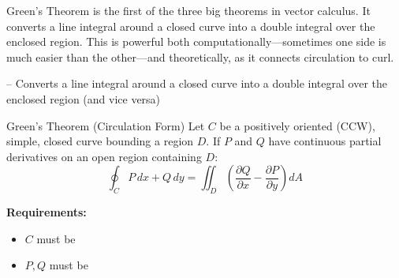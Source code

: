\documentclass[11pt]{article}
\begin{document}

\begin{background}
Green's Theorem is the first of the three big theorems in vector calculus. It converts a line integral around a closed curve into a double integral over the enclosed region. This is powerful both computationally---sometimes one side is much easier than the other---and theoretically, as it connects circulation to curl.
\end{background}


-- Converts a line integral around a closed curve into a double integral over the enclosed region (and vice versa)

\begin{thmbox}{Green's Theorem (Circulation Form)}
Let $C$ be a positively oriented (CCW), simple, closed curve bounding a region $D$. If $P$ and $Q$ have continuous partial derivatives on an open region containing $D$:
\[\boxed{\oint_C P\,dx + Q\,dy = \iint_D \left(\frac{\partial Q}{\partial x} - \frac{\partial P}{\partial y}\right)dA}\]

\textbf{Requirements:}
\begin{itemize}[nosep]
  \item $C$ must be 
  \item $P, Q$ must be 
\end{itemize}
\end{thmbox}
\end{document}
